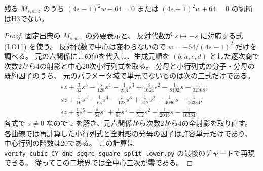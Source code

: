 \begin{proposition}\label{prop:cubic-CY-one-segre-square-split-open-Wminus}
残る $M_{s,w,z}$ のうち
$(4s-1)^2w+64=0$ または $(4s+1)^2w+64=0$ の切断はH3でない。
\end{proposition}
\begin{proof}
固定出典\cite{AS4CYpinned}の $M_{s,w,z}$ の必要表示と、
反対代数が $s\mapsto-s$ に対応する式 (LO11) を使う。
反対代数で中心は変わらないので $w=-64/(4s-1)^2$ だけを調べる。
元の六関係にこの値を代入し、生成元順を $(b,a,c,d)$ とした逐次商で
次数2から4の射影と中心20次小行列式を取る。
分母と小行列式の分子・分母の既約因子のうち、
元のパラメータ域で単元でないものは次の三式だけである。
\begin{align*}
 &sz+\tfrac3{32}s^5-\tfrac5{128}s^4-\tfrac1{256}s^3
     +\tfrac3{1024}s^2-\tfrac1{8192}s-\tfrac1{32768},\\
 &sz+\tfrac1{16}s^5-\tfrac1{64}s^4-\tfrac1{128}s^3
     +\tfrac1{512}s^2+\tfrac1{4096}s-\tfrac1{16384},\\
 &sz+\tfrac18s^5-\tfrac5{64}s^4+\tfrac1{64}s^3
     -\tfrac1{512}s^2+\tfrac1{2048}s-\tfrac1{16384}.
\end{align*}
各式で $s\ne0$ なので $z$ を解き、元六関係から次数2から4の全射影を取り直す。
各曲線では再計算した小行列式と全射影の分母の因子は許容単元だけであり、
中心行列の階数は20である。
この計算は \texttt{verify\_cubic\_CY\_one\_segre\_square\_split\_lower.py}
の最後のチャートで再現できる。
従ってこの二境界では全中心三次が零である。
\end{proof}

